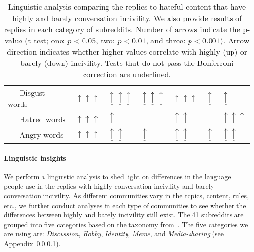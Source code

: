 \documentclass[11pt]{article}
\begin{document}
\begin{table*}
\begin{tabular}{l P{.5in}P{.5in}P{.5in}P{.5in}P{.5in}P{.5in}}
			~~~Disgust words & $\uparrow\uparrow\uparrow$ & $\underline\uparrow\underline\uparrow\underline\uparrow$ & $\underline\uparrow\underline\uparrow\underline\uparrow$ & $\uparrow\uparrow\uparrow$  &  $\underline\uparrow$ & $\underline\uparrow$ \\
			~~~Hatred words & $\uparrow\uparrow\uparrow$ & $\underline\uparrow$ & & $\underline\uparrow\underline\uparrow$ & &  $\underline\uparrow\underline\uparrow\underline\uparrow$ \\
			~~~Angry words &  $\uparrow\uparrow\uparrow$ & $\underline\uparrow\underline\uparrow$ & $\underline\uparrow$ & $\underline\uparrow\underline\uparrow$ & $\underline\uparrow$ & $\underline\uparrow\underline\uparrow$ \\
			\bottomrule
		\end{tabular}
		
		\caption{Linguistic analysis comparing the replies to hateful content that have highly and barely conversation incivility.
			We also provide results of replies in each category of subreddits.
			Number of arrows indicate the p-value (t-test; one: $p<0.05$, two: $p<0.01$, and three: $p<0.001$).
			Arrow direction indicates whether higher values correlate with highly (up) or barely (down) incivility. 
			Tests that do not pass the Bonferroni correction are underlined.}
		\label{t:linguistic}
	\end{table*}
	
	\paragraph{Linguistic insights} 
	We perform a linguistic analysis to shed light on differences in the language people use in the replies with highly conversation incivility and barely conversation incivility.
	As different communities vary in the topics, content, rules, etc., 
	we further conduct analyses in each type of communities to see whether the differences between highly and barely incivility still exist.
	The 41 subreddits are grouped into five categories based on the taxonomy from~\citet{Weld_Zhang_Althoff_2022}.
	The five categories we are using are: \emph{Discussion}, \emph{Hobby}, \emph{Identity}, \emph{Meme}, and \emph{Media-sharing} (see Appendix~\ref{}).
	
\end{document}
